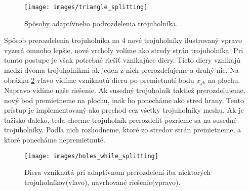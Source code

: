 \begin{figure}
    \centerline{\texttt{[image: images/triangle\_splitting]}}
    \caption[Spôsoby adaptívneho podrozdelenia trojuholníka]
    {Spôsoby adaptívneho podrozdelenia trojuholníka.}
    \label{obr:triangle_splitting}
\end{figure}

Spôsob prerozdelenia 
trojuholníka na 4 nové trojuholníky ilustrovaný vpravo vyzerá omnoho lepšie, nové vrcholy
volíme ako stredy strán trojuholníka. Pri tomto postupe je však potrebné riešiť vznikajúce diery.
Tieto diery vznikajú medzi dvoma trojuholníkmi ak jeden z nich prerozdeľujeme
a druhý nie. Na obrázku \ref{obr:holes_while_splitting} vľavo vidíme vzniknutú dieru po premietnutí bodu
$x_{jk}$ na plochu. Napravo vidíme naše riešenie. Ak susedný trojuholník taktiež prerozdeľujeme, nový bod
premietneme na plochu, inak ho ponecháme ako stred hrany. Tento prístup je implementovaný ako 
prechod cez všetky trojuholníky meshu. Ak je ťažisko ďaleko, teda chceme trojuholník prerozdeliť
pozrieme sa na susedné trojuholníky. Podľa nich rozhodneme, ktoré zo stredov strán premietneme,
a ktoré ponecháme nepremietnuté.

\begin{figure}
    \centerline{\texttt{[image: images/holes\_while\_splitting]}}
    \caption[Úprava adaptívneho podrozdelenia trojuholníkov]
    {Diera vzniknutá pri adaptívnom prerozdelení iba niektorých trojuholníkov(vľavo), 
    navrhované riešenie(vpravo).}
    \label{obr:holes_while_splitting}
\end{figure}